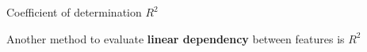 \documentclass[10pt,compress,t,notes=noshow, xcolor=table]{beamer}
\begin{document}
\begin{frame}{Coefficient of determination $R^2$}

Another method to evaluate \textbf{linear dependency} between features is $R^2$

\begin{columns}[c, totalwidth=\textwidth]
\begin{column}{0.48\linewidth}

\end{column}
\end{columns}
\end{frame}
\end{document}
